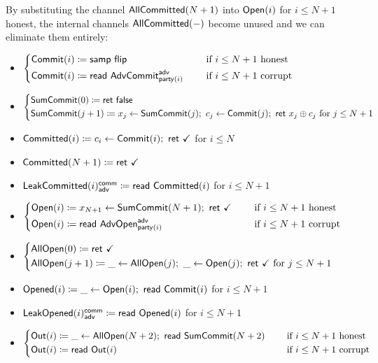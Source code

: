\noindent By substituting the channel $\mathsf{AllCommitted}(N+1)$ into $\mathsf{Open}(i)$ for $i \leq N+1$ honest, the internal channels $\mathsf{AllCommitted}(-)$ become unused and we can eliminate them entirely:

\begin{itemize}
\item {\color{blue} $\begin{cases*} \Commit(i) \coloneqq \samp{\flip} & \hspace{10pt} \text{if $i \leq N+1$ honest} \\ \Commit(i) \coloneqq \read{\AdvCommit^\adv_{\party(i)}} & \hspace{10pt} \text{if $i \leq N+1$ corrupt} \end{cases*}$}
\item {\color{blue} $\begin{cases*} \SumCommit(0) \coloneqq \ret{\false} \\ \SumCommit(j+1) \coloneqq x_j \leftarrow \SumCommit(j); \ c_j \leftarrow \Commit(j); \ \ret{x_j \oplus c_j} \text{ for $j \leq N+1$} \end{cases*}$}
\item {\color{magenta} $\mathsf{Committed}(i) \coloneqq c_i \leftarrow \mathsf{Commit}(i); \ \mathsf{ret} \ \checkmark$ for $i \leq N$}
\item {\color{magenta} $\mathsf{Committed}(N+1) \coloneqq \mathsf{ret} \ \checkmark$}
\item {\color{magenta} $\mathsf{LeakCommitted}(i)^{\mathsf{comm}}_{\mathsf{adv}} \coloneqq \mathsf{read} \ \mathsf{Committed}(i)$ for $i \leq N+1$}
\item {\color{teal} $\begin{cases*} \Open(i) \coloneqq x_{N+1} \leftarrow \SumCommit(N+1); \ \ret{\checkmark} & \hspace{10pt} \text{if $i \leq N+1$ honest} \\ \Open(i) \coloneqq \read{\AdvOpen^\adv_{\party(i)}} & \hspace{10pt} \text{if $i \leq N+1$ corrupt} \end{cases*}$}
\item {\color{teal} $\begin{cases*} \AllOpen(0) \coloneqq \ret{\checkmark} \\ \AllOpen(j+1) \coloneqq \_ \leftarrow \AllOpen(j); \ \_ \leftarrow \Open(j); \ \ret{\checkmark} \text{ for $j \leq N+1$} \end{cases*}$}
\item {\color{red} $\mathsf{Opened}(i) \coloneqq \_ \leftarrow \mathsf{Open}(i); \ \mathsf{read} \ \mathsf{Commit}(i)$ for $i \leq N+1$}
\item {\color{red} $\mathsf{LeakOpened}(i)^{\mathsf{comm}}_{\mathsf{adv}} \coloneqq \mathsf{read} \ \mathsf{Opened}(i)$ for $i \leq N+1$}
\item $\begin{cases*} \Out(i) \coloneqq \_ \leftarrow \AllOpen(N+2); \ \read{\SumCommit(N+2)} & \hspace{10pt} \text{if $i \leq N+1$ honest} \\ \Out(i) \coloneqq \read{\Out(i)} & \hspace{10pt} \text{if $i \leq N+1$ corrupt} \end{cases*}$
\end{itemize}

